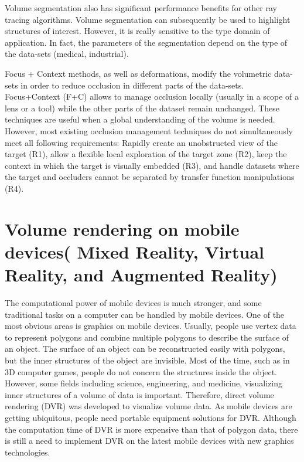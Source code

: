 Volume segmentation also has significant performance benefits for other ray tracing algorithms. Volume segmentation can subsequently be used to highlight structures of interest. However, it is really sensitive to the type domain of application. In fact, the parameters of the segmentation depend on the type of the data-sets (medical, industrial).  


Focus + Context methods, as well as deformations, modify the volumetric data-sets in order to reduce occlusion in different parts of the data-sets. Focus+Context (F+C) allows to manage occlusion locally (usually in a scope of a lens or a tool) while the other parts of the dataset remain unchanged. These techniques are useful when a global understanding of the volume is needed. However, most existing occlusion management techniques do not simultaneously meet all following requirements: Rapidly create an unobstructed view of the target (R1), allow a flexible local exploration of the target zone (R2), keep the context in which the target is visually embedded (R3), and handle datasets where the target and occluders cannot 
be separated by transfer function manipulations (R4).

\section{Volume rendering on mobile devices( Mixed Reality, Virtual Reality, and Augmented Reality) }

The computational power of mobile devices is much stronger, and some traditional tasks on a computer can be
handled by mobile devices. One of the most obvious areas is
graphics on mobile devices. Usually, people use vertex data to
represent polygons and combine multiple polygons to describe
the surface of an object. The surface of an object can be
reconstructed easily with polygons, but the inner structures of the object are invisible. Most of the time, such as in
3D computer games, people do not concern the structures
inside the object. However, some fields including science,
engineering, and medicine, visualizing inner structures of a volume of data is important. Therefore, direct volume rendering
(DVR) was developed to visualize volume data. As
mobile devices are getting ubiquitous, people need portable
equipment solutions for DVR. Although the computation time
of DVR is more expensive than that of polygon data, there is
still a need to implement DVR on the latest mobile devices with
new graphics technologies.

